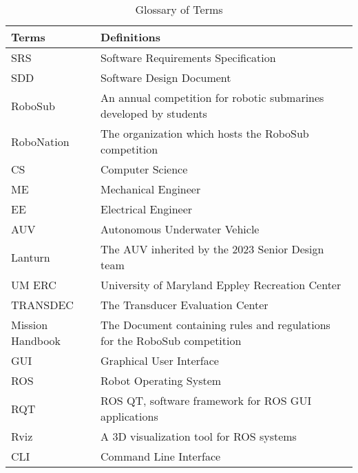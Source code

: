 \begin{table}[h]
{
    \renewcommand{\arraystretch}{1.5} %
    \begin{tabularx}{\textwidth}{| P{6em} | X |}
        \hline
        \textbf{Terms}      & \textbf{Definitions} \\
        \hline
        SRS     & Software Requirements Specification \\
        \hline
        SDD     & Software Design Document \\
        \hline
        RoboSub &An annual competition for robotic submarines developed by students \\
        \hline
        RoboNation & The organization which hosts the RoboSub competition \\
        \hline
        CS      & Computer Science \\
        \hline
        ME      & Mechanical Engineer \\
        \hline
        EE      & Electrical Engineer \\
        \hline
        AUV     & Autonomous Underwater Vehicle \\
        \hline
        Lanturn & The AUV inherited by the 2023 Senior Design team \\
        \hline
        UM ERC  &University of Maryland Eppley Recreation Center \\
        \hline
        TRANSDEC & The Transducer Evaluation Center  \\
        \hline
        Mission Handbook & The Document containing rules and regulations for the RoboSub competition \\
        \hline
        GUI     & Graphical User Interface \\
        \hline
        ROS     & Robot Operating System \\
        \hline
        RQT     & ROS QT, software framework for ROS GUI applications \\
        \hline
        Rviz    & A 3D visualization tool for ROS systems \\
        \hline
        CLI     & Command Line Interface\\
        \hline
    \end{tabularx}
    \caption{\label{tab:glossary} Glossary of Terms}
}
\end{table}


